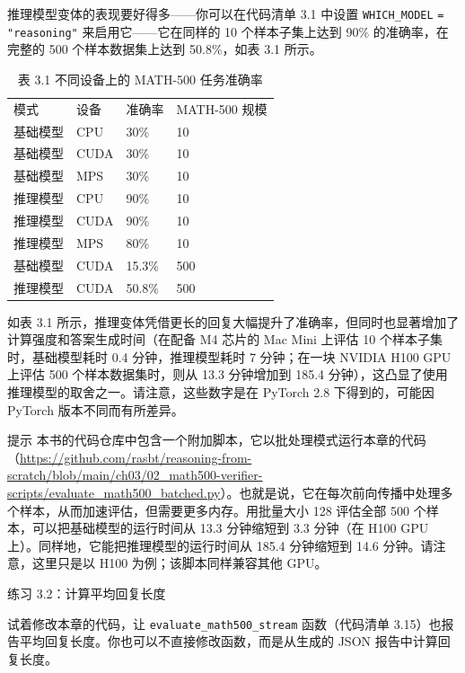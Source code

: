 推理模型变体的表现要好得多——你可以在代码清单 3.1 中设置 \texttt{WHICH\_MODEL} \texttt{= }\texttt{"}\texttt{reasoning}\texttt{"} 来启用它——它在同样的 10 个样本子集上达到 90\% 的准确率，在完整的 500 个样本数据集上达到 50.8\%，如表 3.1 所示。

\begin{table}[htbp]
\centering\small
\centering
\caption{表 3.1 不同设备上的 MATH-500 任务准确率}
\begin{tabularx}{\linewidth}{XXXX}
\toprule
模式 & 设备 & 准确率 & MATH-500 规模 \\
基础模型 & CPU & 30\% & 10 \\
基础模型 & CUDA & 30\% & 10 \\
基础模型 & MPS & 30\% & 10 \\
推理模型 & CPU & 90\% & 10 \\
推理模型 & CUDA & 90\% & 10 \\
推理模型 & MPS & 80\% & 10 \\ \addlinespace

基础模型 & CUDA & 15.3\% & 500 \\
推理模型 & CUDA & 50.8\% & 500 \\ \bottomrule
\end{tabularx}
\end{table}

如表 3.1 所示，推理变体凭借更长的回复大幅提升了准确率，但同时也显著增加了计算强度和答案生成时间（在配备 M4 芯片的 Mac Mini 上评估 10 个样本子集时，基础模型耗时 0.4 分钟，推理模型耗时 7 分钟；在一块 NVIDIA H100 GPU 上评估 500 个样本数据集时，则从 13.3 分钟增加到 185.4 分钟），这凸显了使用推理模型的取舍之一。请注意，这些数字是在 PyTorch 2.8 下得到的，可能因 PyTorch 版本不同而有所差异。

\begin{myWarning}{提示}
 本书的代码仓库中包含一个附加脚本，它以批处理模式运行本章的代码（\href{https://github.com/rasbt/reasoning-from-scratch/blob/main/ch03/02\_math500-verifier-scripts/evaluate\_math500\_batched.py}{https://github.com/rasbt/reasoning-from-scratch/blob/main/ch03/02\_math500-verifier-scripts/evaluate\_math500\_batched.py}）。也就是说，它在每次前向传播中处理多个样本，从而加速评估，但需要更多内存。用批量大小 128 评估全部 500 个样本，可以把基础模型的运行时间从 13.3 分钟缩短到 3.3 分钟（在 H100 GPU 上）。同样地，它能把推理模型的运行时间从 185.4 分钟缩短到 14.6 分钟。请注意，这里只是以 H100 为例；该脚本同样兼容其他 GPU。\end{myWarning}

\begin{mySidebar}{练习 3.2：计算平均回复长度}

试着修改本章的代码，让 \texttt{evaluate\_math500\_stream} 函数（代码清单 3.15）也报告平均回复长度。你也可以不直接修改函数，而是从生成的 JSON 报告中计算回复长度。

\end{mySidebar}

